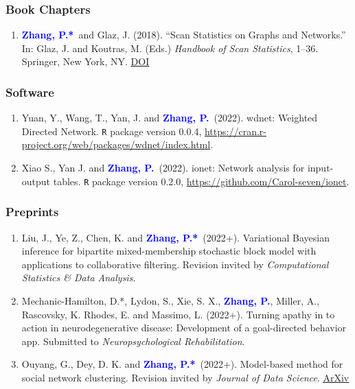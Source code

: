 \documentclass{res}
\newcommand{\PZ}{\textbf{\textcolor{blue}{Zhang, P.*}}}
\newcommand{\PZnot}{\textbf{\textcolor{blue}{Zhang, P.}}}
\begin{document}
\begin{resume}
\subsubsection{Book Chapters}
\begin{enumerate}
	\item \PZ\ and {\sc Glaz, J.} (2018). ``Scan 
	Statistics on Graphs and Networks.'' In: Glaz, J. and Koutras, 
	M. (Eds.) {\em Handbook of Scan Statistics}, 1--36. Springer, 
	New York, NY. 
	\href{https://doi.org/10.1007/978-1-4614-8414-1_43-1}
	{\underline{DOI}}	
\end{enumerate}

\subsubsection{Software}
\begin{enumerate}
	\item {\sc Yuan, Y., Wang, T., Yan, J.} and \PZnot\ (2022). 
	wdnet: Weighted Directed Network. {\tt R} package version 0.0.4, 
	\url{https://cran.r-project.org/web/packages/wdnet/index.html}.
	
	\item{\sc Xiao S., Yan J.} and \PZnot\ (2022).
	ionet: Network analysis for input-output tables. {\tt R} package version 0.2.0, \url{https://github.com/Carol-seven/ionet}.
\end{enumerate}

\subsubsection{Preprints}
\begin{enumerate}	
	\item {\sc Liu, J., Ye, Z., Chen, K.} and \PZ\ (2022+). Variational Bayesian inference for bipartite mixed-membership stochastic block model with applications to collaborative filtering. Revision invited by {\em Computational Statistics \& Data Analysis}.
	\item {\sc Mechanic-Hamilton, D.*, Lydon, S., Xie, S. X.,} 
	\PZnot, {\sc Miller, A., Rascovsky, K. Rhodes, E.} and {\sc 
	Massimo, L.} (2022+). Turning apathy in to action in 
	neurodegenerative disease: Development of a goal-directed 
	behavior app. Submitted to {\em Neuropsychological 
	Rehabilitation}.
	
	\item {\sc Ouyang, G., Dey, D. K.} and \PZ\ (2022+). 
	Model-based method for social network clustering. Revision 
	invited by {\em Journal of Data Science}. 
	\href{https://arxiv.org/pdf/1708.07604.pdf}{\underline{ArXiv}}
\end{enumerate}


\end{resume}
\end{document}
